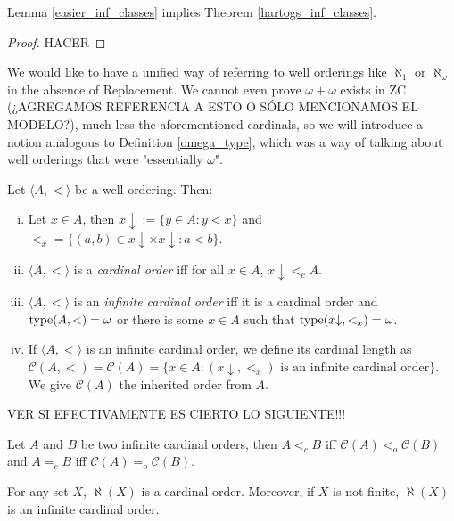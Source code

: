 \begin{theorem}
	Lemma \ref{easier_inf_classes} implies Theorem \ref{hartogs_inf_classes}.
\end{theorem}
\begin{proof}
	HACER
\end{proof}

We would like to have a unified way of referring to well orderings like $\aleph_1$ or $\aleph_\omega$ in the absence of Replacement. We cannot even prove $\omega+\omega$ exists in ZC (¿AGREGAMOS REFERENCIA A ESTO O SÓLO MENCIONAMOS EL MODELO?), much less the aforementioned cardinals, so we will introduce a notion analogous to Definition \ref{omega_type}, which was a way of talking about well orderings that were "essentially $\omega$".

\begin{definition}
	Let $\langle A,< \rangle$ be a well ordering. Then:
	\begin{enumerate}[(i)]
		\item Let $x\in A$, then $x{\downarrow} := \{y\in A: y<x\}$ and $<_x = \{(a,b) \in x{\downarrow}\times x{\downarrow} : a<b\}$.
		\item $\langle A,< \rangle$ is a \emph{cardinal order} iff for all $x\in A$, $x{\downarrow} <_c A$.
		\item $\langle A,< \rangle$ is an \emph{infinite cardinal order} iff it is a cardinal order and ${\operatorname{type}(A,<)} = \omega$ or there is some $x\in A$ such that $\operatorname{type}(x{\downarrow},<_x) = \omega$.
		\item If $\langle A,< \rangle$ is an infinite cardinal order, we define its cardinal length as $\mathcal{C}(A,<) = \mathcal{C}(A) = \{x\in A: (x{\downarrow},<_x) \text{ is an infinite cardinal order}\}$. We give $\mathcal{C}(A)$ the inherited order from $A$.
	\end{enumerate}
\end{definition}

VER SI EFECTIVAMENTE ES CIERTO LO SIGUIENTE!!!

\begin{lemma}
	\label{weak_aleph}
	Let $A$ and $B$ be two infinite cardinal orders, then $A <_c B$ iff $\mathcal{C}(A) <_o \mathcal{C}(B)$ and $A =_c B$ iff $\mathcal{C}(A) =_o \mathcal{C}(B)$.
\end{lemma}

\begin{lemma}
	For any set $X$, $\aleph(X)$ is a cardinal order. Moreover, if $X$ is not finite, $\aleph(X)$ is an infinite cardinal order.
\end{lemma}

